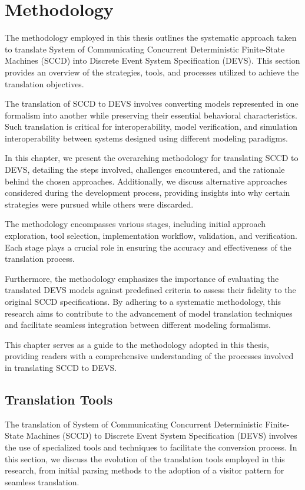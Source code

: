 \chapter{Methodology}
\label{chapt:Methodology}
The methodology employed in this thesis outlines the systematic approach taken to translate System of Communicating Concurrent Deterministic Finite-State Machines (SCCD) into Discrete Event System Specification (DEVS). This section provides an overview of the strategies, tools, and processes utilized to achieve the translation objectives.

The translation of SCCD to DEVS involves converting models represented in one formalism into another while preserving their essential behavioral characteristics. Such translation is critical for interoperability, model verification, and simulation interoperability between systems designed using different modeling paradigms.

In this chapter, we present the overarching methodology for translating SCCD to DEVS, detailing the steps involved, challenges encountered, and the rationale behind the chosen approaches. Additionally, we discuss alternative approaches considered during the development process, providing insights into why certain strategies were pursued while others were discarded.

The methodology encompasses various stages, including initial approach exploration, tool selection, implementation workflow, validation, and verification. Each stage plays a crucial role in ensuring the accuracy and effectiveness of the translation process.

Furthermore, the methodology emphasizes the importance of evaluating the translated DEVS models against predefined criteria to assess their fidelity to the original SCCD specifications. By adhering to a systematic methodology, this research aims to contribute to the advancement of model translation techniques and facilitate seamless integration between different modeling formalisms.

This chapter serves as a guide to the methodology adopted in this thesis, providing readers with a comprehensive understanding of the processes involved in translating SCCD to DEVS.

\section{Translation Tools}

The translation of System of Communicating Concurrent Deterministic Finite-State Machines (SCCD) to Discrete Event System Specification (DEVS) involves the use of specialized tools and techniques to facilitate the conversion process. In this section, we discuss the evolution of the translation tools employed in this research, from initial parsing methods to the adoption of a visitor pattern for seamless translation.

